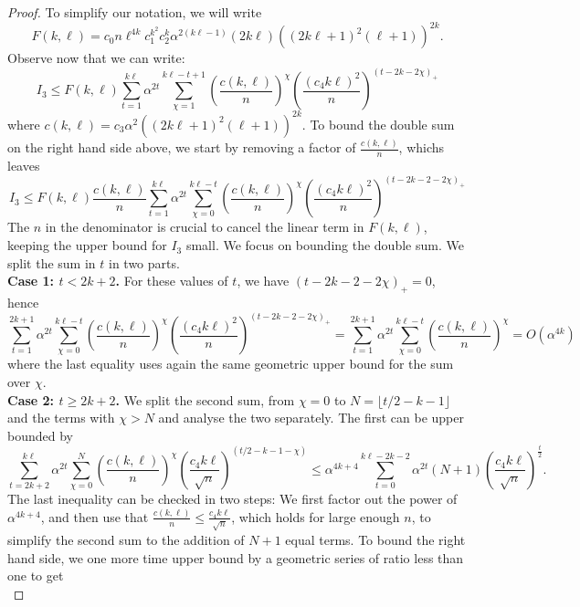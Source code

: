 \begin{proof}
To simplify our notation, we will write 
\[
F(k,\ell)=c_0
n
\ell^{4k} 
c_1^{ k^2}
c_2^k
\alpha^{2 (k\ell-1)}
(2k\ell)
((2k\ell + 1)^2 (\ell + 1))^{2k}.
\]
Observe now that we can write:
\[
I_3\leq F(k,\ell)\sum_{t=1}^{k\ell} \alpha^{2t}\sum_{\chi=1}^{k\ell-t+1} \left(\frac{c(k,\ell)}{n}\right)^{\chi} \left(\frac{(c_4k\ell)^2}{n}\right)^{(t-2k-2\chi)_+}
\]
where $c(k,\ell)=c_3\alpha^2((2k\ell+1)^2(\ell+1))^{2k}$.
To bound the double sum on the right hand side above, 
we start by removing a factor of $\frac{c(k,\ell)}{n}$, 
whichs leaves
\begin{equation}\label{I_3bound}
I_3\leq F(k,\ell)\frac{c(k,\ell)}{n} \sum_{t=1}^{k\ell} \alpha^{2t}\sum_{\chi=0}^{k\ell-t} \left(\frac{c(k,\ell)}{n}\right)^{\chi} \left(\frac{(c_4k\ell)^2}{n}\right)^{(t-2k-2-2\chi)_+}
\end{equation}
The $n$ in the denominator is crucial to cancel the linear term in $F(k,\ell)$, keeping the upper bound for $I_3$ small. We focus on bounding the double sum. We split the sum in $t$ in two parts.\\
{\bf Case 1: $t< 2k+2$.} For these values of $t$, we have $(t-2k-2-2\chi)_+=0$, hence
\begin{equation}\label{I_3:eq1}
\sum_{t=1}^{2k+1} \alpha^{2t}\sum_{\chi=0}^{k\ell-t} \left(\frac{c(k,\ell)}{n}\right)^{\chi} \left(\frac{(c_4k\ell)^2}{n}\right)^{(t-2k-2-2\chi)_+}=\sum_{t=1}^{2k+1} \alpha^{2t}\sum_{\chi=0}^{k\ell-t} \left(\frac{c(k,\ell)}{n}\right)^{\chi}=O(\alpha^{4k})
\end{equation}
where the last equality uses again the same geometric upper bound for the sum over $\chi$.\\
{\bf Case 2: $t\geq 2k+2$.} 
We split the second sum, from $\chi=0$ to $N=\lfloor t/2-k-1\rfloor$ and
the terms with $\chi > N$ and analyse the two separately. 
The first can be upper bounded by
\[
\sum_{t=2k+2}^{k\ell} \alpha^{2t}\sum_{\chi=0}^{N} 
\left(\frac{c(k,\ell)}{n}\right)^{\chi} 
\left(\frac{c_4 k \ell}{\sqrt{n}}\right)^{(t/2-k-1-\chi)}
\leq
\alpha^{4k+4} \sum_{t=0}^{k\ell-2k-2}
\alpha^{2t} (N+1)
\left( \frac{c_4 k \ell}{\sqrt{n}} \right)^{\frac{t}{2}}.
\]
The last inequality can be checked in two steps: 
We first factor out the power of $\alpha^{4k+4}$, 
and then use that 
$\frac{c(k,\ell)}{n}\leq \frac{c_4 k \ell}{\sqrt{n}}$,
which holds for large enough $n$,
to simplify the second sum to the addition of $N+1$ equal terms. 
To bound the right hand side, 
we one more time upper bound by a 
geometric series of ratio less than one to get
\begin{equation}\label{I_3eq2}

\end{equation}
\end{proof}
